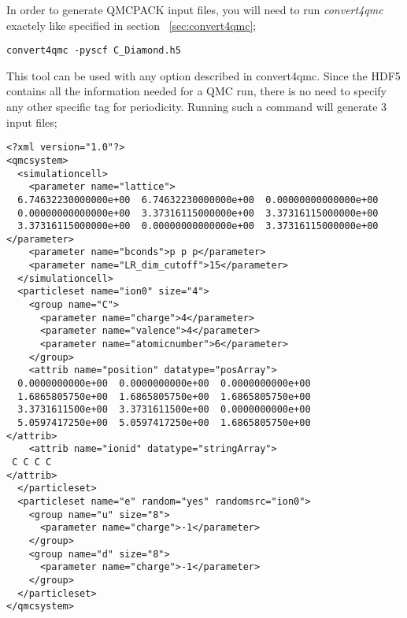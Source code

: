 \begin{itemize}
In order to generate QMCPACK input files, you will need to run \textit{convert4qmc} exactely like specified in section ~\ref{sec:convert4qmc};
\begin{lstlisting}
convert4qmc -pyscf C_Diamond.h5
\end{lstlisting}

This tool can be used with any option described in convert4qmc. Since the HDF5 contains all the information needed for a QMC run, there is no need to specify any other specific tag for periodicity.
Running such a command will generate 3 input files;\\
\begin{lstlisting}[caption=CDiamond.structure.xml. This file contains the geometry of the system.]
<?xml version="1.0"?>
<qmcsystem>
  <simulationcell>
    <parameter name="lattice">
  6.74632230000000e+00  6.74632230000000e+00  0.00000000000000e+00
  0.00000000000000e+00  3.37316115000000e+00  3.37316115000000e+00
  3.37316115000000e+00  0.00000000000000e+00  3.37316115000000e+00
</parameter>
    <parameter name="bconds">p p p</parameter>
    <parameter name="LR_dim_cutoff">15</parameter>
  </simulationcell>
  <particleset name="ion0" size="4">
    <group name="C">
      <parameter name="charge">4</parameter>
      <parameter name="valence">4</parameter>
      <parameter name="atomicnumber">6</parameter>
    </group>
    <attrib name="position" datatype="posArray">
  0.0000000000e+00  0.0000000000e+00  0.0000000000e+00
  1.6865805750e+00  1.6865805750e+00  1.6865805750e+00
  3.3731611500e+00  3.3731611500e+00  0.0000000000e+00
  5.0597417250e+00  5.0597417250e+00  1.6865805750e+00
</attrib>
    <attrib name="ionid" datatype="stringArray">
 C C C C
</attrib>
  </particleset>
  <particleset name="e" random="yes" randomsrc="ion0">
    <group name="u" size="8">
      <parameter name="charge">-1</parameter>
    </group>
    <group name="d" size="8">
      <parameter name="charge">-1</parameter>
    </group>
  </particleset>
</qmcsystem>
  \end{lstlisting}


\end{itemize}
